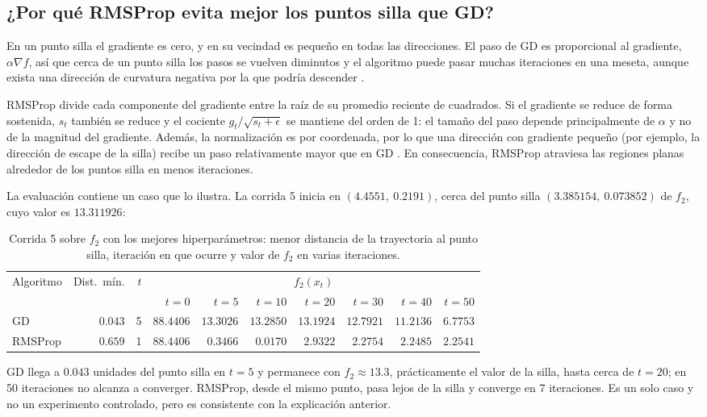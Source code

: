 \subsection{¿Por qué RMSProp evita mejor los puntos silla que GD?}
\label{sec:silla}

En un punto silla el gradiente es cero, y en su vecindad es pequeño en
todas las direcciones. El paso de GD es proporcional al gradiente,
$\alpha\nabla f$, así que cerca de un punto silla los pasos se vuelven
diminutos y el algoritmo puede pasar muchas iteraciones en una meseta,
aunque exista una dirección de curvatura negativa por la que podría
descender \cite{dauphin2014identifying,goodfellow2016deep}.

RMSProp divide cada componente del gradiente entre la raíz de su promedio
reciente de cuadrados. Si el gradiente se reduce de forma sostenida, $s_t$
también se reduce y el cociente $g_t/\sqrt{s_t+\epsilon}$ se mantiene del
orden de 1: el tamaño del paso depende principalmente de $\alpha$ y no de la
magnitud del gradiente. Además, la normalización es por coordenada, por lo
que una dirección con gradiente pequeño (por ejemplo, la dirección de
escape de la silla) recibe un paso relativamente mayor que en GD
\cite{tieleman2012rmsprop,ruder2016overview}. En consecuencia, RMSProp
atraviesa las regiones planas alrededor de los puntos silla en menos
iteraciones.

La evaluación contiene un caso que lo ilustra. La corrida 5 inicia en
$(4.4551,\ 0.2191)$, cerca del punto silla $(3.385154,\ 0.073852)$ de $f_2$,
cuyo valor es $13.311926$:

\begin{table}[H]
\centering
\small
\begin{tabular}{lrrrrrrrrr}
\toprule
Algoritmo & Dist.\ mín. & $t$ & \multicolumn{7}{c}{$f_2(x_t)$} \\
\cmidrule(lr){4-10}
 & & & $t=0$ & $t=5$ & $t=10$ & $t=20$ & $t=30$ & $t=40$ & $t=50$ \\
\midrule
GD      & $0.043$ & 5 & $88.4406$ & $13.3026$ & $13.2850$ & $13.1924$ & $12.7921$ & $11.2136$ & $6.7753$ \\
RMSProp & $0.659$ & 1 & $88.4406$ & $0.3466$  & $0.0170$  & $2.9322$  & $2.2754$  & $2.2485$  & $2.2541$ \\
\bottomrule
\end{tabular}
\caption{Corrida 5 sobre $f_2$ con los mejores hiperparámetros: menor
distancia de la trayectoria al punto silla, iteración en que ocurre y valor
de $f_2$ en varias iteraciones.}
\label{tab:silla}
\end{table}

GD llega a $0.043$ unidades del punto silla en $t=5$ y permanece con
$f_2\approx13.3$, prácticamente el valor de la silla, hasta cerca de
$t=20$; en 50 iteraciones no alcanza a converger. RMSProp, desde el mismo
punto, pasa lejos de la silla y converge en 7 iteraciones. Es un solo caso
y no un experimento controlado, pero es consistente con la explicación
anterior.
